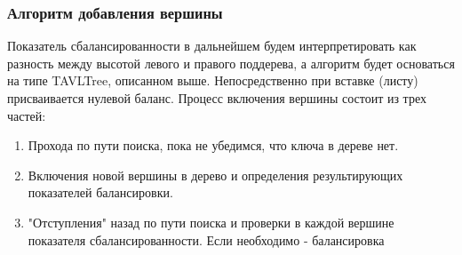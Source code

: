 \begin{frame}

    \frametitle{Алгоритм добавления вершины}

    Показатель сбалансированности в дальнейшем будем интерпретировать
    как разность между высотой левого и правого поддерева,
    а алгоритм будет основаться на типе TAVLTree, описанном выше.
    Непосредственно при вставке (листу) присваивается нулевой баланс.
    Процесс включения вершины состоит из трех частей:

    \begin{enumerate}
        \item Прохода по пути поиска, пока не убедимся, что ключа в дереве нет.
        \item Включения новой вершины в дерево и определения результирующих показателей балансировки.
        \item "Отступления" назад по пути поиска и проверки в каждой вершине показателя сбалансированности.
        Если необходимо - балансировка
    \end{enumerate}
\end{frame}